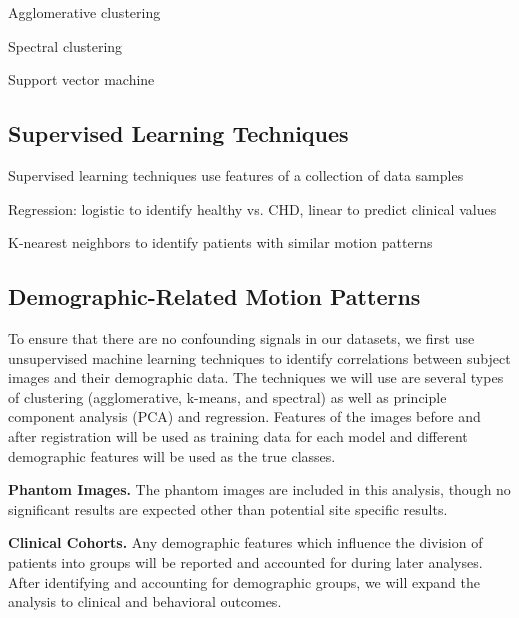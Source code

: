 Agglomerative clustering

Spectral clustering

Support vector machine

\subsection{Supervised Learning Techniques}

Supervised learning techniques use features of a collection of data samples

Regression: logistic to identify healthy vs. CHD, linear to predict clinical values

K-nearest neighbors to identify patients with similar motion patterns







\subsection{Demographic-Related Motion Patterns} %


To ensure that there are no confounding signals in our datasets, we first use unsupervised machine learning techniques to identify correlations between subject images and their demographic data. The techniques we will use are several types of clustering (agglomerative, k-means, and spectral) as well as principle component analysis (PCA) and regression. Features of the images before and after registration will be used as training data for each model and different demographic features will be used as the true classes. %

\textbf{Phantom Images.} The phantom images are included in this analysis, though no significant results are expected other than potential site specific results.

\textbf{Clinical Cohorts.} Any demographic features which influence the division of patients into groups will be reported and accounted for during later analyses. After identifying and accounting for demographic groups, we will expand the analysis to clinical and behavioral outcomes.


